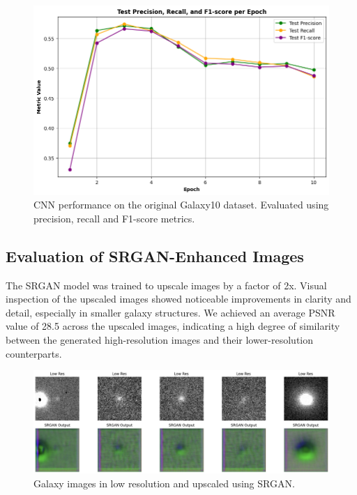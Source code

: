 \documentclass[10pt,twocolumn,letterpaper]{article}
\begin{document}
\begin{figure}[htbp]
    \includegraphics[width=\linewidth]{initial_cnn_metrics.png}
    \caption{CNN performance on the original Galaxy10 dataset. Evaluated using precision, recall and F1-score metrics.}
    \label{fig:initialcnnmet}
  \end{figure}


\subsection{Evaluation of SRGAN-Enhanced Images}
The SRGAN model was trained to upscale images by a factor of 2x. 
Visual inspection of the upscaled images showed noticeable improvements in clarity and detail, especially in smaller galaxy structures. 
We achieved an average PSNR value of 28.5 across the upscaled images, indicating a high degree of similarity between the generated high-resolution images and their lower-resolution counterparts.
\begin{figure}[htbp]
    \includegraphics[width=\linewidth]{srgan.png}
    \caption{Galaxy images in low resolution and upscaled using SRGAN.}
    \label{fig:galaxysrgan}
  \end{figure}
\end{document}
